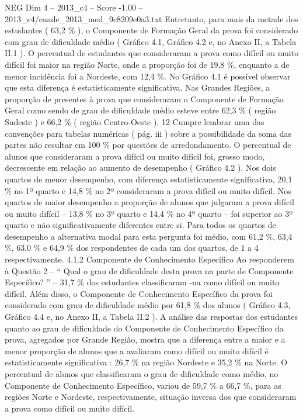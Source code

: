 \begin{textsample}{NEG Dim 4 – 2013\_c4 – Score -1.00 – 2013\_c4/enade\_2013\_med\_9c8209e0a3.txt}
Entretanto, para mais da metade dos estudantes ( 63,2 \% ), o Componente de Formação Geral da prova foi considerado com grau de dificuldade médio ( Gráfico 4.1, Gráfico 4.2 e, no Anexo II, a Tabela II.1 ).
O percentual de estudantes que consideraram a prova como difícil ou muito difícil foi maior na região Norte, onde a proporção foi de 19,8 \%, enquanto a de menor incidência foi a Nordeste, com 12,4 \%.
No Gráfico 4.1 é possível observar que esta diferença é estatisticamente significativa.
Nas Grandes Regiões, a proporção de presentes à prova que consideraram o Componente de Formação Geral como sendo de grau de dificuldade médio esteve entre 62,3 \% ( região Sudeste ) e 66,2 \% ( região Centro-Oeste ). 12 Cumpre lembrar uma das convenções para tabelas numéricas ( pág. iii ) sobre a possibilidade da soma das partes não resultar em 100 \% por questões de arredondamento.
O percentual de alunos que consideraram a prova difícil ou muito difícil foi, grosso modo, decrescente em relação ao aumento de desempenho ( Gráfico 4.2 ).
Nos dois quartos de menor desempenho, com diferença estatisticamente significativa, 20,1 \% no 1º quarto e 14,8 \% no 2º consideraram a prova difícil ou muito difícil.
Nos quartos de maior desempenho a proporção de alunos que julgaram a prova difícil ou muito difícil – 13,8 \% no 3º quarto e 14,4 \% no 4º quarto – foi superior ao 3º quarto e não significativamente diferentes entre si.
Para todos os quartos de desempenho a alternativa modal para esta pergunta foi médio, com 61,2 \%, 63,4 \%, 63,0 \% e 64,9 \% dos respondentes de cada um dos quartos, de 1 a 4 respectivamente. 4.1.2 Componente de Conhecimento Específico Ao responderem à Questão 2 – “ Qual o grau de dificuldade desta prova na parte de Componente Específico? ” – 31,7 \% dos estudantes classificaram -na como difícil ou muito difícil.
Além disso, o Componente de Conhecimento Específico da prova foi considerado com grau de dificuldade médio por 61,8 \% dos alunos ( Gráfico 4.3, Gráfico 4.4 e, no Anexo II, a Tabela II.2 ).
A análise das respostas dos estudantes quanto ao grau de dificuldade do Componente de Conhecimento Específico da prova, agregados por Grande Região, mostra que a diferença entre a maior e a menor proporção de alunos que a avaliaram como difícil ou muito difícil é estatisticamente significativa : 26,7 \% na região Nordeste e 35,2 \% na Norte.
O percentual de alunos que classificaram o grau de dificuldade como médio, no Componente de Conhecimento Específico, variou de 59,7 \% a 66,7 \%, para as regiões Norte e Nordeste, respectivamente, situação inversa dos que consideraram a prova como difícil ou muito difícil.

\end{textsample}
